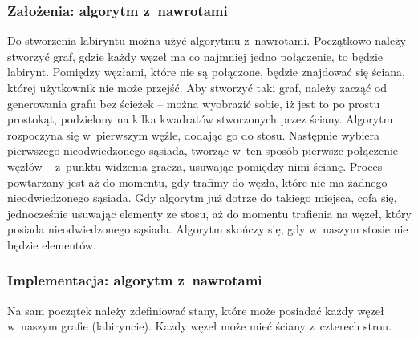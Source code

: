 \documentclass[oneside,polski,logo]{amuthesis}
\begin{document}
\subsubsection{Założenia: algorytm z~nawrotami}
Do stworzenia labiryntu można użyć algorytmu z~nawrotami. Początkowo należy stworzyć graf, gdzie każdy węzeł ma co najmniej jedno połączenie, to będzie labirynt. Pomiędzy węzłami, które nie są połączone, będzie znajdować się ściana, której użytkownik nie może przejść. Aby stworzyć taki graf, należy zacząć od generowania grafu bez ścieżek – można wyobrazić sobie, iż jest to po prostu prostokąt, podzielony na kilka kwadratów stworzonych przez ściany. Algorytm rozpoczyna się w~pierwszym węźle, dodając go do stosu. Następnie wybiera pierwszego nieodwiedzonego sąsiada, tworząc w~ten sposób pierwsze połączenie węzłów – z~punktu widzenia gracza, usuwając pomiędzy nimi ścianę. Proces powtarzany jest aż do momentu, gdy trafimy do węzła, które nie ma żadnego nieodwiedzonego sąsiada. Gdy algorytm już dotrze do takiego miejsca, cofa się, jednocześnie usuwając elementy ze stosu, aż do momentu trafienia na węzeł, który posiada nieodwiedzonego sąsiada. Algorytm skończy się, gdy w~naszym stosie nie będzie elementów. \cite{maze}

\subsubsection{Implementacja: algorytm z~nawrotami}
\par Na sam początek należy zdefiniować stany, które może posiadać każdy węzeł w~naszym grafie (labiryncie). Każdy węzeł może mieć ściany z~czterech stron.
\end{document}
